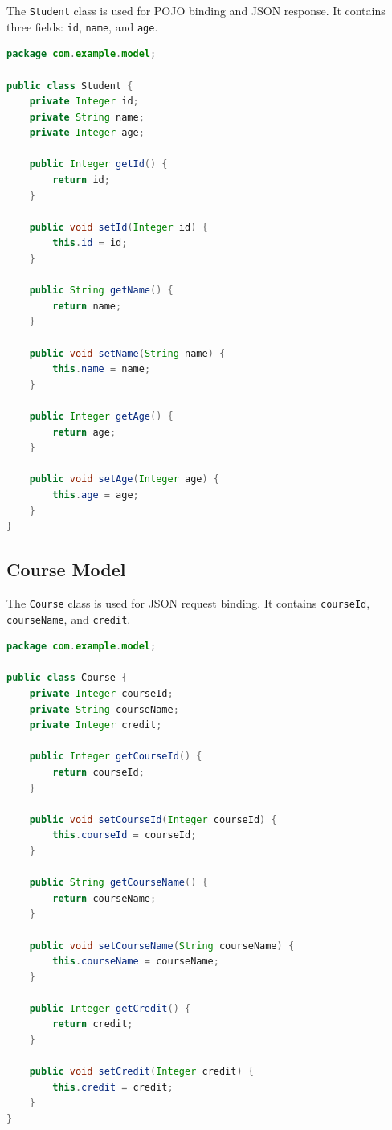 \documentclass[12pt,a4paper]{article}
\begin{document}
The \texttt{Student} class is used for POJO binding and JSON response. It contains three fields:
\texttt{id}, \texttt{name}, and \texttt{age}.

\begin{lstlisting}[caption={Student.java},label={lst:student},language=Java]
package com.example.model;

public class Student {
    private Integer id;
    private String name;
    private Integer age;

    public Integer getId() {
        return id;
    }

    public void setId(Integer id) {
        this.id = id;
    }

    public String getName() {
        return name;
    }

    public void setName(String name) {
        this.name = name;
    }

    public Integer getAge() {
        return age;
    }

    public void setAge(Integer age) {
        this.age = age;
    }
}
\end{lstlisting}

\subsection{Course Model}

The \texttt{Course} class is used for JSON request binding. It contains \texttt{courseId},
\texttt{courseName}, and \texttt{credit}.

\begin{lstlisting}[caption={Course.java},label={lst:course},language=Java]
package com.example.model;

public class Course {
    private Integer courseId;
    private String courseName;
    private Integer credit;

    public Integer getCourseId() {
        return courseId;
    }

    public void setCourseId(Integer courseId) {
        this.courseId = courseId;
    }

    public String getCourseName() {
        return courseName;
    }

    public void setCourseName(String courseName) {
        this.courseName = courseName;
    }

    public Integer getCredit() {
        return credit;
    }

    public void setCredit(Integer credit) {
        this.credit = credit;
    }
}
\end{lstlisting}
\end{document}

